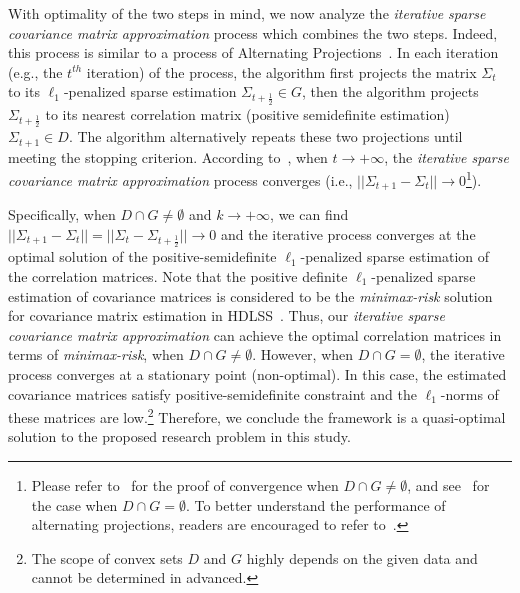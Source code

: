 With optimality of the two steps in mind, we now analyze the \emph{iterative sparse covariance matrix approximation} process which combines the two steps. 
Indeed, this process is similar to a process of Alternating Projections~\cite{von1951functional,escalante2011alternating}. 
In each iteration (e.g., the $t^{th}$ iteration) of the process, the algorithm first projects the matrix $\Sigma_{t}$ to its $\ell_1$-penalized sparse estimation $\Sigma_{t+\frac{1}{2}}\in G$, then the algorithm projects $\Sigma_{t+\frac{1}{2}}$ to its nearest correlation matrix (positive semidefinite estimation) $\Sigma_{t+1}\in D$. 
The algorithm alternatively repeats these two projections until meeting the stopping criterion. 
According to~\cite{cheney1959proximity,bregman1967relaxation}, when $t\to+\infty$, the \emph{iterative sparse covariance matrix approximation} process converges (i.e., $||\Sigma_{t+1}-\Sigma_t||\to 0$\footnote{Please refer to~\cite{bregman1967relaxation} for the proof of convergence when $D\cap G\neq\emptyset$, and see~\cite{cheney1959proximity} for the case when $D\cap G=\emptyset$. 
To better understand the performance of alternating projections, readers are encouraged to refer to~\cite{escalante2011alternating}.}).

Specifically, when  $D\cap G\neq\emptyset$ and $k\to+\infty$,  we can find $||\Sigma_{t+1}-\Sigma_t||=||\Sigma_{t}-\Sigma_{t+\frac{1}{2}}||\to 0$ and the iterative process converges at the optimal solution of the positive-semidefinite $\ell_1$-penalized sparse estimation of the correlation matrices. 
Note that the positive definite $\ell_1$-penalized sparse estimation of covariance matrices is considered to be the \emph{minimax-risk} solution for covariance matrix estimation in HDLSS~\cite{cai2012minimax,xue2012positive}. 
Thus, our \emph{iterative sparse covariance matrix approximation} can achieve the optimal correlation matrices in terms of \emph{minimax-risk}, when  $D\cap G\neq\emptyset$. 
However, when $D\cap G=\emptyset$, the iterative process converges at a stationary point (non-optimal). 
In this case, the estimated covariance matrices satisfy positive-semidefinite constraint and the $\ell_1$-norms of these matrices are low.\footnote{The scope of convex sets $D$ and $G$ highly depends on the given data and cannot be determined in advanced.} 
Therefore, we conclude the \TheName{} framework is a quasi-optimal solution to the proposed research problem in this study.

